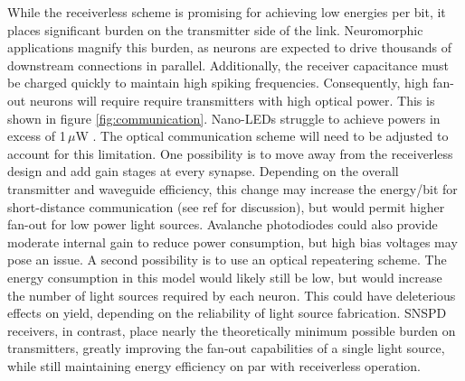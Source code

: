 \documentclass[twocolumn]{article}
\begin{document}
While the receiverless scheme is promising for achieving low energies per bit, it places significant burden on the transmitter side of the link. Neuromorphic applications magnify this burden, as neurons are expected to drive thousands of downstream connections in parallel. Additionally, the receiver capacitance must be charged quickly to maintain high spiking frequencies. Consequently, high fan-out neurons will require require transmitters with high optical power. This is shown in figure \ref{fig:communication}. Nano-LEDs struggle to achieve powers in excess of 1\,$\mu$W \cite{romeira2019physical}. The optical communication scheme will need to be adjusted to account for this limitation. One possibility is to move away from the receiverless design and add gain stages at every synapse. Depending on the overall transmitter and waveguide efficiency, this change may increase the energy/bit for short-distance communication (see ref \cite{miller2017attojoule} for discussion), but would permit higher fan-out for low power light sources. Avalanche photodiodes could also provide moderate internal gain to reduce power consumption, but high bias voltages may pose an issue. A second possibility is to use an optical repeatering scheme. The energy consumption in this model would likely still be low, but would increase the number of light sources required by each neuron. This could have deleterious effects on yield, depending on the reliability of light source fabrication. SNSPD receivers, in contrast, place nearly the theoretically minimum possible burden on transmitters, greatly improving the fan-out capabilities of a single light source, while still maintaining energy efficiency on par with receiverless operation.
\end{document}
